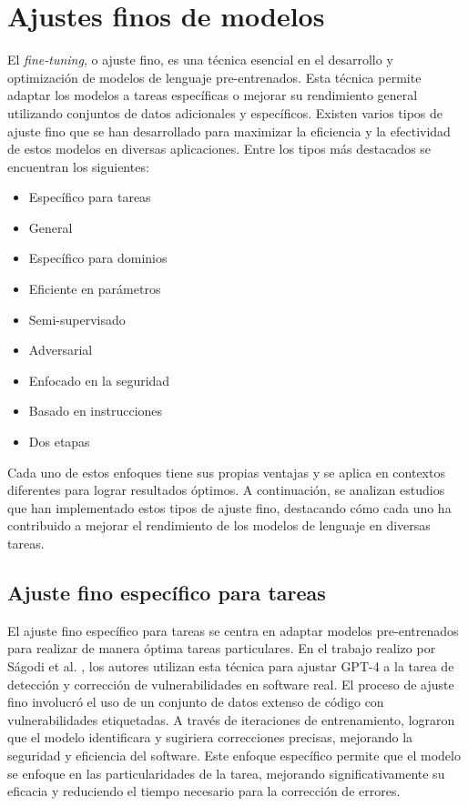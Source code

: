 \section{Ajustes finos de modelos}   

El \textit{fine-tuning}, o ajuste fino, es una técnica esencial en el desarrollo y optimización de modelos de lenguaje pre-entrenados. Esta técnica permite adaptar los modelos a tareas específicas o mejorar su rendimiento general utilizando conjuntos de datos adicionales y específicos. Existen varios tipos de ajuste fino que se han desarrollado para maximizar la eficiencia y la efectividad de estos modelos en diversas aplicaciones. Entre los tipos más destacados se encuentran los siguientes: 

\begin{itemize}
	\item Específico para tareas
	\item General
	\item Específico para dominios
	\item Eficiente en parámetros
	\item Semi-supervisado
	\item Adversarial
	\item Enfocado en la seguridad
	\item Basado en instrucciones
	\item Dos etapas
\end{itemize}

Cada uno de estos enfoques tiene sus propias ventajas y se aplica en contextos diferentes para lograr resultados óptimos. A continuación, se analizan estudios que han implementado estos tipos de ajuste fino, destacando cómo cada uno ha contribuido a mejorar el rendimiento de los modelos de lenguaje en diversas tareas.

\subsection{Ajuste fino específico para tareas}

El ajuste fino específico para tareas se centra en adaptar modelos pre-entrenados para realizar de manera óptima tareas particulares. En el trabajo realizo por Ságodi et al. \cite{Sagodi2024}, los autores utilizan esta técnica para ajustar GPT-4 a la tarea de detección y corrección de vulnerabilidades en software real. El proceso de ajuste fino involucró el uso de un conjunto de datos extenso de código con vulnerabilidades etiquetadas. A través de iteraciones de entrenamiento, lograron que el modelo identificara y sugiriera correcciones precisas, mejorando la seguridad y eficiencia del software. Este enfoque específico permite que el modelo se enfoque en las particularidades de la tarea, mejorando significativamente su eficacia y reduciendo el tiempo necesario para la corrección de errores.


